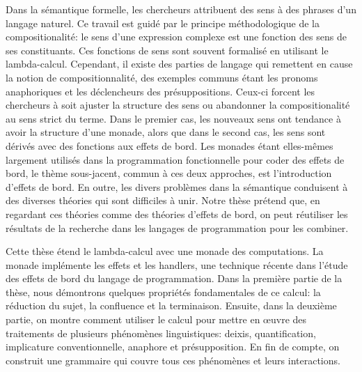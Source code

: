 \begin{ThesisAbstract}
  \begin{FrenchAbstract}
    Dans la sémantique formelle, les chercheurs attribuent des sens à des
    phrases d'un langage naturel. Ce travail est guidé par le principe
    méthodologique de la compositionalité: le sens d'une expression
    complexe est une fonction des sens de ses constituants. Ces fonctions
    de sens sont souvent formalisé en utilisant le
    lambda-calcul. Cependant, il existe des parties de langage qui
    remettent en cause la notion de compositionnalité, des exemples communs
    étant les pronoms anaphoriques et les déclencheurs des
    présuppositions. Ceux-ci forcent les chercheurs à soit ajuster la
    structure des sens ou abandonner la compositionalité au sens strict du
    terme. Dans le premier cas, les nouveaux sens ont tendance à avoir la
    structure d'une monade, alors que dans le second cas, les sens sont
    dérivés avec des fonctions aux effets de bord. Les monades étant
    elles-mêmes largement utilisés dans la programmation fonctionnelle pour
    coder des effets de bord, le thème sous-jacent, commun à ces deux
    approches, est l'introduction d'effets de bord. En outre, les divers
    problèmes dans la sémantique conduisent à des diverses théories qui
    sont difficiles à unir. Notre thèse prétend que, en regardant ces
    théories comme des théories d'effets de bord, on peut réutiliser les
    résultats de la recherche dans les langages de programmation pour les
    combiner.

    Cette thèse étend le lambda-calcul avec une monade des computations. La
    monade implémente les effets et les handlers, une technique récente
    dans l'étude des effets de bord du langage de programmation. Dans la
    première partie de la thèse, nous démontrons quelques propriétés
    fondamentales de ce calcul: la réduction du sujet, la confluence et la
    terminaison. Ensuite, dans la deuxième partie, on montre comment
    utiliser le calcul pour mettre en œuvre des traitements de plusieurs
    phénomènes linguistiques: deixis, quantification, implicature
    conventionnelle, anaphore et présupposition. En fin de compte, on
    construit une grammaire qui couvre tous ces phénomènes et leurs
    interactions.

  \end{FrenchAbstract}


\end{ThesisAbstract}
